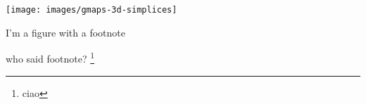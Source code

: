 \chapter{}

\begin{marginfigure}
  \texttt{[image: images/gmaps-3d-simplices]}
  \caption{I'm a figure with a footnote}
\end{marginfigure}

\blindtext

who said footnote? \footnote{ciao \blindtext}
